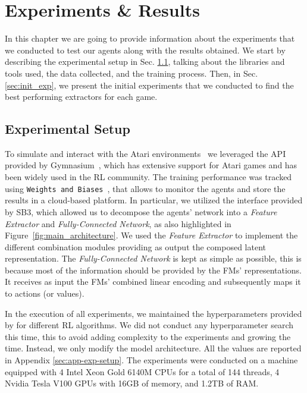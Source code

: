 
\chapter{Experiments \& Results}
\label{ch:experiments_and_results}
In this chapter we are going to provide information about the experiments that we conducted to test our agents along with the results obtained.
We start by describing the experimental setup in Sec. \ref{sec:exp_setup}, talking about the libraries and tools used, the data collected, and the training process.
Then, in Sec. \ref{sec:init_exp}, we present the initial experiments that we conducted to find the best performing extractors for each game.

\section{Experimental Setup}\label{sec:exp_setup}
To simulate and interact with the Atari environments~\citep{bellemare2013atari} we leveraged the API provided by Gymnasium~\citep{towers_gymnasium_2023}, which has extensive support for Atari games and has been widely used in the RL community.
The training performance was tracked using \texttt{Weights and Biases}~\citep{wandb}, that allows to monitor the agents and store the results in a cloud-based platform.
In particular, we utilized the interface provided by SB3, which allowed us to decompose the agents' network into a \textit{Feature Extractor} and \textit{Fully-Connected Network}, as also highlighted in Figure~\ref{fig:main_architecture}.
We used the \textit{Feature Extractor} to implement the different combination modules providing as output the composed latent representation.
The \textit{Fully-Connected Network} is kept as simple as possible, this is because most of the information should be provided by the FMs' representations.
It receives as input the FMs' combined linear encoding and subsequently maps it to actions (or values).

In the execution of all experiments, we maintained the hyperparameters provided by \citet{rl-zoo3} for different RL algorithms.
We did not conduct any hyperparameter search this time, this to avoid adding complexity to the experiments and growing the time.
Instead, we only modify the model architecture.
All the values are reported in Appendix \ref{sec:app-exp-setup}.
The experiments were conducted on a machine equipped with 4 Intel Xeon Gold 6140M CPUs for a total of 144 threads, 4 Nvidia Tesla V100 GPUs with 16GB of memory, and 1.2TB of RAM.


